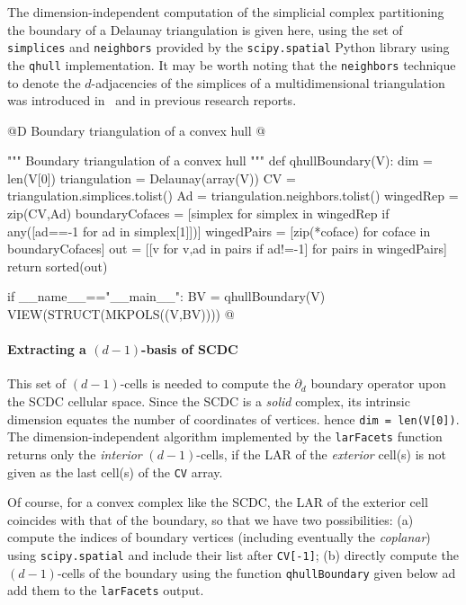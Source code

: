 \documentclass[11pt,oneside]{article}	%
\begin{document}
The dimension-independent computation of the simplicial complex partitioning the boundary of a Delaunay triangulation is given here, using the set of \texttt{simplices} and \texttt{neighbors} provided by the \texttt{scipy.spatial} Python library using the \texttt{qhull} implementation.
It may be worth noting that the \texttt{neighbors} technique to denote the $d$-adjacencies of the simplices of a multidimensional triangulation was introduced in~\cite{DBLP:journals/cad/FerruciP91,Paoluzzi:1993:DMS:169728.169719} and in previous research reports. 

@D Boundary triangulation of a convex hull
@{""" Boundary triangulation of a convex hull """
def qhullBoundary(V):
	dim = len(V[0])
	triangulation = Delaunay(array(V))
	CV = triangulation.simplices.tolist()
	Ad = triangulation.neighbors.tolist()
	wingedRep = zip(CV,Ad)
	boundaryCofaces = [simplex for simplex in wingedRep if any([ad==-1 for ad in simplex[1]])]
	wingedPairs = [zip(*coface) for coface in boundaryCofaces]
	out = [[v for v,ad in pairs if ad!=-1] for pairs in wingedPairs]
	return sorted(out)
	
if __name__=="__main__":
	BV = qhullBoundary(V)
	VIEW(STRUCT(MKPOLS((V,BV))))
@}


\paragraph{Extracting a $(d-1)$-basis of SCDC}

This set of $(d-1)$-cells is needed to compute the $\partial_d$ boundary operator upon the SCDC cellular space.
Since the SCDC is a \emph{solid} complex, its intrinsic dimension equates the number of coordinates of vertices.
hence \texttt{dim = len(V[0])}. The dimension-independent algorithm implemented by the \texttt{larFacets} function
returns only the \emph{interior} $(d-1)$-cells, if the LAR of the \emph{exterior} cell(s) is not given as the last cell(s) of the \texttt{CV} array. 

Of course, for a convex complex like the SCDC, the LAR of the exterior cell coincides with that of the boundary, so that we have two possibilities: (a) compute the indices of boundary vertices (including eventually the \emph{coplanar}) using \texttt{scipy.spatial} and include their list after \texttt{CV[-1]}; (b) directly compute the $(d-1)$-cells of the boundary using the function \texttt{qhullBoundary} given below ad add them to the \texttt{larFacets} output. 
\end{document}
